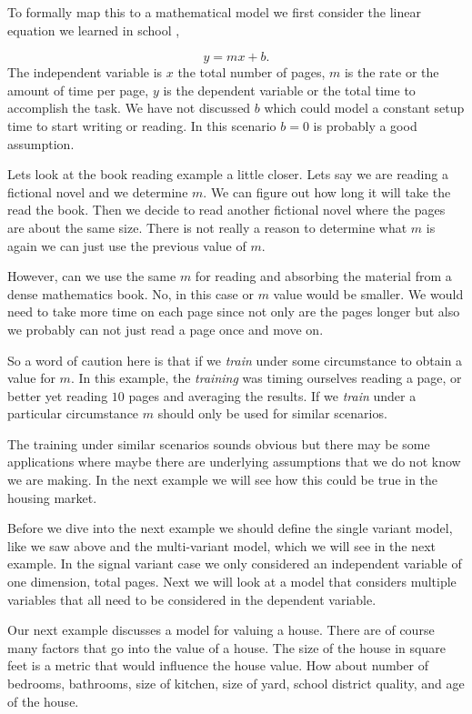To formally map this to a mathematical model we first consider the linear equation we learned in school \cite{boa06},

\begin{equation}
y = mx+b.
\label{eq:svlinmodel}
\end{equation}
\noindent
The independent variable is $x$ the total number of pages, $m$ is the rate or the amount of time per page, $y$ is the dependent variable or the total time to accomplish the task. We have not discussed $b$ which could model a constant setup time to start writing or reading. In this scenario $b=0$ is probably a good assumption. 

Lets look at the book reading example a little closer. Lets say we are reading a fictional novel and we determine $m$. We can figure out how long it will take the read the book. Then we decide to read another fictional novel where the pages are about the same size. There is not really a reason to determine what $m$ is again we can just use the previous value of $m$. 

However, can we use the same $m$ for reading and absorbing the material from a dense mathematics book. No, in this case or $m$ value would be smaller. We would need to take more time on each page since not only are the pages longer but also we probably can not just read a page once and move on.

So a word of caution here is that if we \emph{train} under some circumstance to obtain a value for $m$. In this example, the \emph{training} was timing ourselves reading a page, or better yet reading $10$ pages and averaging the results. If we \emph{train} under a particular circumstance $m$ should only be used for similar scenarios. 

The training under similar scenarios sounds obvious but there may be some applications where maybe there are underlying assumptions that we do not know we are making. In the next example we will see how this could be true in the housing market. 

Before we dive into the next example we should define the single variant model, like we saw above and the multi-variant model, which we will see in the next example. In the signal variant case we only considered an independent variable of one dimension, total pages. Next we will look at a model that considers multiple variables that all need to be considered in the dependent variable. 

Our next example discusses a model for valuing a house. There are of course many factors that go into the value of a house. The size of the house in square feet is a metric that would influence the house value. How about number of bedrooms, bathrooms, size of kitchen, size of yard, school district quality, and age of the house. 

